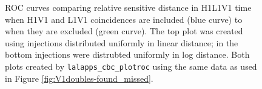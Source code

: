 \begin{figure}[p]
\center
{}
\label{fig:V1doubles-roc}
\caption{ROC curves comparing relative sensitive distance in H1L1V1 time when H1V1 and L1V1 coincidences are included (blue curve) to when they are excluded (green curve). The top plot was created using injections distributed uniformly in linear distance; in the bottom injections were distrubted uniformly in log distance. Both plots created by \texttt{lalapps\_cbc\_plotroc} using the same data as used in Figure \ref{fig:V1doubles-found_missed}.}
\end{figure}


